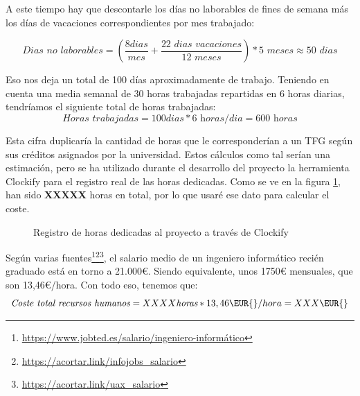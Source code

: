 A este tiempo hay que descontarle los días no laborables de fines de semana más los días de vacaciones correspondientes por mes trabajado:

\begin{equation*}
    \textit{Dias no laborables} = \left( \frac{8 \textit{dias}}{mes} + \frac{22 \textit{ dias vacaciones}}{12 \textit{ meses}}\right) * 5 \textit{ meses} \approx 50 \textit{ dias}
\end{equation*}

Eso nos deja un total de 100 días aproximadamente de trabajo. Teniendo en cuenta una media semanal de 30 horas trabajadas repartidas en 6 horas diarias, tendríamos el siguiente total de horas trabajadas:
\begin{equation*}
    \textit{Horas trabajadas} = 100 \textit{dias} * 6 \textit{ horas/dia} = 600 \textit{ horas}
\end{equation*}

Esta cifra duplicaría la cantidad de horas que le corresponderían a un TFG según sus créditos asignados por la universidad. Estos cálculos como tal serían una estimación, pero se ha utilizado durante el desarrollo del proyecto la herramienta Clockify para el registro real de las horas dedicadas. Como se ve en la figura \ref{fig:clockify}, han sido \textbf{XXXXX} horas en total,
por lo que usaré ese dato para calcular el coste.

\begin{figure}[h!]
    \caption{Registro de horas dedicadas al proyecto a través de Clockify}
    \label{fig:clockify}
\end{figure}

Según varias fuentes\footnote{\url{https://www.jobted.es/salario/ingeniero-informático}}\footnotecomma\footnote{\url{https://acortar.link/infojobs_salario}}\footnotecomma\footnote{\url{https://acortar.link/uax_salario}}, el salario medio de un ingeniero informático recién graduado está en torno a 21.000€. Siendo equivalente, unos 1750€ mensuales, que son 13,46€/hora. Con todo eso, tenemos que:
\begin{equation*}
    \textit{Coste total recursos humanos} = XXXX \textit{horas} * 13,46\EUR{}/hora = XXX \EUR{}
\end{equation*}


